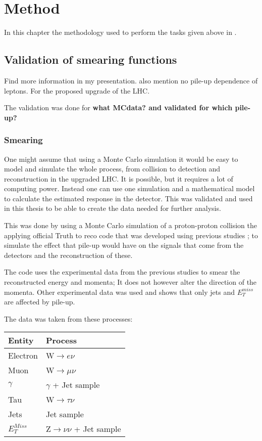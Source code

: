 \chapter{Method}\label{cha:meth}
In this chapter the methodology used to perform the tasks given above in .
\newpage
\section{Validation of smearing functions} 


Find more information in my presentation. also mention no pile-up dependence of leptons.
For the proposed upgrade of the LHC.

The validation was done for \textbf{what MCdata? and validated for which pile-up?}

\subsection{Smearing}\label{sec:vali:subsec:smear}
One might assume that using a Monte Carlo simulation it would be easy to model and simulate the whole process, from collision to detection and reconstruction in the upgraded LHC. It is possible, but it requires a lot of computing power. Instead one can use one simulation and a mathematical model to calculate the estimated response in the detector. This was validated and used in this thesis to be able to create the data needed for further analysis. 

This was done by using a Monte Carlo simulation of a proton-proton collision the applying official Truth to reco code that was developed using previous studies \citep{ATL-PHYS-PUB-2013-004}; to simulate the effect that pile-up would have on the signals that come from the detectors and the reconstruction of these.

The code uses the experimental data from the previous studies to smear the reconstructed energy and momenta; It does not however alter the direction of the momenta. Other experimental data was used and shows that only jets and $E^{miss}_T$ are affected by pile-up. 

The data was taken from these processes:
\begin{center}
\begin{tabular}{|l|l|}
\hline
Entity & Process \\ \hline
Electron & W$\rightarrow e\nu$ \\
Muon & W$\rightarrow \mu \nu$ \\
$\gamma$ & $\gamma$ + Jet sample \\
Tau & W$\rightarrow \tau \nu$ \\
Jets & Jet sample \\
$E_T^{Miss}$ & Z$\rightarrow \nu \nu$ + Jet sample \\ \hline
\end{tabular}
\end{center}

